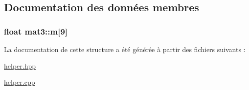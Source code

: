 \subsection{Documentation des données membres}
\hypertarget{structmat3_af5c67cec8668816c844bfd3f097f9eb2}{
\subsubsection[{m}]{\setlength{\rightskip}{0pt plus 5cm}float mat3\+::m\mbox{[}9\mbox{]}}}\label{structmat3_af5c67cec8668816c844bfd3f097f9eb2}


La documentation de cette structure a été générée à partir des fichiers suivants \+:\begin{DoxyCompactItemize}
\item 
\hyperlink{helper_8hpp}{helper.\+hpp}\item 
\hyperlink{helper_8cpp}{helper.\+cpp}\end{DoxyCompactItemize}

